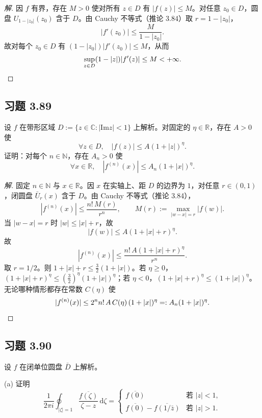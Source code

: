 \documentclass[11pt,a4paper]{article}
\newcommand{\R}{\mathbb{R}}
\newcommand{\C}{\mathbb{C}}
\newcommand{\N}{\mathbb{N}}
\renewcommand{\Im}{\mathrm{Im}}
\newcommand{\dd}{\mathrm{d}}
\theoremstyle{definition}
\newenvironment{solution}{\begin{proof}[解]}{\end{proof}}
\begin{document}
\begin{solution}
  因 $f$ 有界，存在 $M > 0$ 使对所有 $z \in D$ 有 $|f(z)| \le M$。对任意 $z_0 \in D$，圆盘 $U_{1-|z_0|}(z_0)$ 含于 $D$。由 Cauchy 不等式（推论 3.84）取 $r = 1 - |z_0|$，
  \[
    |f'(z_0)| \le \frac{M}{1-|z_0|}.
  \]
  故对每个 $z_0 \in D$ 有 $(1-|z_0|)|f'(z_0)| \le M$，从而
  \[
    \sup_{z \in D}(1-|z|)|f'(z)| \le M < +\infty.\qedhere
  \]
\end{solution}

\subsection{习题 3.89}

设 $f$ 在带形区域 $D := \{z \in \C : |\Im z| < 1\}$ 上解析。对固定的 $\eta \in \R$，存在 $A > 0$ 使
\[
  \forall z \in D,\quad |f(z)| \le A(1 + |z|)^\eta.
\]
证明：对每个 $n \in \N$，存在 $A_n > 0$ 使
\[
  \forall x \in \R,\quad |f^{(n)}(x)| \le A_n(1 + |x|)^\eta.
\]

\begin{solution}
  固定 $n \in \N$ 与 $x \in \R$。因 $x$ 在实轴上、距 $D$ 的边界为 $1$，对任意 $r \in (0,1)$，闭圆盘 $\bar{U}_r(x)$ 含于 $D$。由 Cauchy 不等式（推论 3.84），
  \[
    |f^{(n)}(x)| \le \frac{n!\,M(r)}{r^n},
    \qquad M(r) := \max_{|w-x|=r}|f(w)|.
  \]
  当 $|w-x| = r$ 时 $|w| \le |x| + r$，故
  \[
    |f(w)| \le A(1+|x|+r)^\eta.
  \]
  故
  \[
    |f^{(n)}(x)| \le \frac{n!\,A(1+|x|+r)^\eta}{r^n}.
  \]
  取 $r = 1/2$。则 $1+|x|+r \le \frac{3}{2}(1+|x|)$。若 $\eta \ge 0$，$(1+|x|+r)^\eta \le (\frac{3}{2})^\eta(1+|x|)^\eta$；若 $\eta < 0$，$(1+|x|+r)^\eta \le (1+|x|)^\eta$。无论哪种情形都存在常数 $C(\eta)$ 使
  \[
    |f^{(n)}(x)| \le 2^n n!\,A\,C(\eta)\,(1+|x|)^\eta
    =: A_n(1+|x|)^\eta.\qedhere
  \]
\end{solution}

\subsection{习题 3.90}

设 $f$ 在闭单位圆盘 $\bar{D}$ 上解析。

(a) 证明
\[
  \frac{1}{2\pi i}\oint_{|\zeta|=1}
  \frac{\overline{f(\zeta)}}{\zeta - z}\,\dd\zeta
  =
  \begin{cases}
    \overline{f(0)} & \text{若 } |z| < 1,\\
    \overline{f(0)} - \overline{f(1/\bar{z})} & \text{若 } |z| > 1.
  \end{cases}
\]
\end{document}
